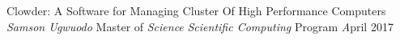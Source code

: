 \documentclass[letterpaper,12pt]{report}
\begin{document}

\thesistitle
{
	 Clowder: A Software for Managing Cluster Of High Performance Computers  }
	{\emph{Samson Ugwuodo}}
	{Master of \emph{Science}}
	{ \emph{Scientific Computing} Program}
	{\emph April 2017} 
















\end{document}

